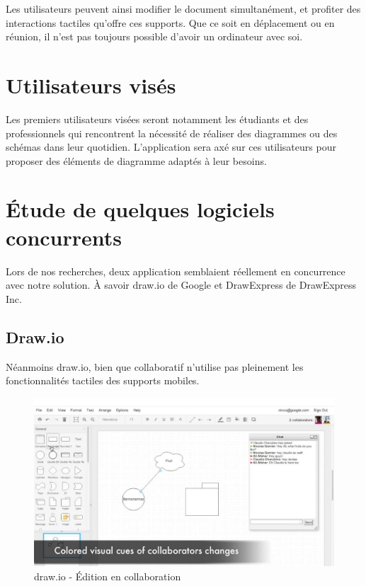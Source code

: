 \documentclass[a4paper,11pt]{article}
\begin{document}
Les utilisateurs peuvent ainsi modifier le document simultanément, et profiter des interactions tactiles qu'offre ces supports.
Que ce soit en déplacement ou en réunion, il n'est pas toujours possible d'avoir un ordinateur avec soi.
 

\section{Utilisateurs visés}
Les premiers utilisateurs visées seront notamment les étudiants et des professionnels qui rencontrent la nécessité de réaliser des diagrammes ou des schémas dans leur quotidien.
L'application sera axé sur ces utilisateurs pour proposer des éléments de diagramme adaptés à leur besoins.







\newpage
\section{Étude de quelques logiciels concurrents}
Lors de nos recherches, deux application semblaient réellement en concurrence avec notre solution. À savoir draw.io de Google et DrawExpress de DrawExpress Inc.



\subsection{Draw.io}
Néanmoins draw.io, bien que collaboratif n'utilise pas pleinement les fonctionnalités tactiles des supports mobiles.

\begin{figure}[h]
	\centering
	\includegraphics[width=15cm]{img/drawio.PNG}
	\caption{draw.io - Édition en collaboration}
\end{figure}
\end{document}
